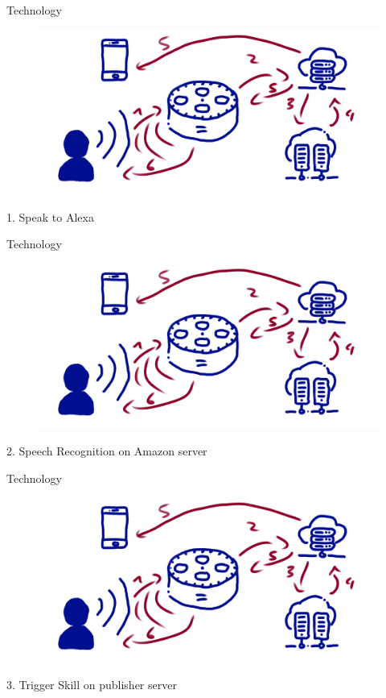 \documentclass[aspectratio=169]{beamer}
\begin{document}
\begin{frame}{Technology}
\begin{figure}
	\includegraphics[width=0.9\linewidth]{images/alexatech}
\end{figure}
1. Speak to Alexa
\end{frame}

\begin{frame}{Technology}
\begin{figure}
	\includegraphics[width=0.9\linewidth]{images/alexatech}
\end{figure}
2. Speech Recognition on Amazon server
\end{frame}

\begin{frame}{Technology}
\begin{figure}
	\includegraphics[width=0.9\linewidth]{images/alexatech}
\end{figure}
3. Trigger Skill on publisher server
\end{frame}
\end{document}
